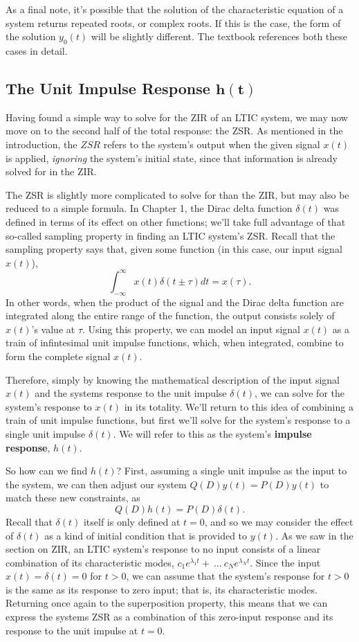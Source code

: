 \documentclass{article}
\begin{document}
	As a final note, it's possible that the solution of the characteristic equation of a system returns repeated roots, or complex roots. If this is the case, the form of the solution \(y_0(t)\) will be slightly different. The textbook references both these cases in detail.

\setcounter{subsection}{2}
\subsection{The Unit Impulse Response \(\mathbf{h(t)}\)}

Having found a simple way to solve for the ZIR of an LTIC system, we may now move on to the second half of the total response: the ZSR. As mentioned in the introduction, the \(ZSR\) refers to the system's output when the given signal \(x(t)\) is applied, \textit{ignoring} the system's initial state, since that information is already solved for in the ZIR.

The ZSR is slightly more complicated to solve for than the ZIR, but may also be reduced to a simple formula. In Chapter 1, the Dirac delta function \(\delta(t)\) was defined in terms of its effect on other functions; we'll take full advantage of that so-called sampling property in finding an LTIC system's ZSR. Recall that the sampling property says that, given some function (in this case, our input signal \(x(t)\)), \[
  \int_{-\infty}^{\infty}x(t)\delta(t\pm\tau)dt = x(\tau).
\] 
In other words, when the product of the signal and the Dirac delta function are integrated along the entire range of the function, the output consists solely of \(x(t)\)'s value at \(\tau\). Using this property, we can model an input signal \(x(t)\) as a train of infintesimal unit impulse functions, which, when integrated, combine to form the complete signal \(x(t).\)
 
Therefore, simply by knowing the mathematical description of the input signal \(x(t)\) and the systems response to the unit impulse \(\delta(t)\), we can solve for the system's response to \(x(t)\) in its totality. We'll return to this idea of combining a train of unit impulse functions, but first we'll solve for the system's response to a single unit impulse \(\delta(t)\). We will refer to this as the system's \textbf{impulse response}, \(h(t).\)

So how can we find \(h(t)\)? First, assuming a single unit impulse as the input to the system, we can then adjust our system \(Q(D)y(t) = P(D)y(t)\) to match these new constraints, as \[
	Q(D)h(t) = P(D)\delta(t).
\]
Recall that \(\delta(t)\) itself is only defined at \(t=0\), and so we may consider the effect of \(\delta(t)\) as a kind of initial condition that is provided to \(y(t)\). As we saw in the section on ZIR, an LTIC system's response to no input consists of a linear combination of its characteristic modes, \(c_1e^{\lambda_1 t} + \ ... \ c_Ne^{\lambda_N t}\). Since the input \(x(t) = \delta(t) = 0\) for \(t > 0\), we can assume that the system's response for \(t>0\) is the same as its response to zero input; that is, its characteristic modes. Returning once again to the superposition property, this means that we can express the systems ZSR as a combination of this zero-input response and its response to the unit impulse at \(t=0\).
\end{document}

